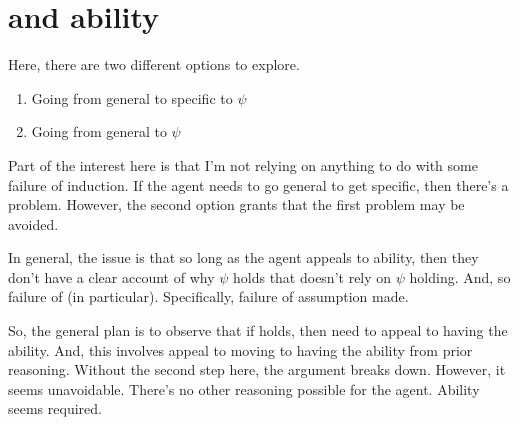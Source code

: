 




\newpage

\section{\nI{} and ability}
\label{sec:ni-ability}

\begin{note}[Notes]
  Here, there are two different options to explore.
  \begin{enumerate}
  \item Going from general to specific to \(\psi\)
  \item Going from general to \(\psi\)
  \end{enumerate}
  Part of the interest here is that I'm not relying on anything to do with some failure of induction.
  If the agent needs to go general to get specific, then there's a problem.
  However, the second option grants that the first problem may be avoided.

  In general, the issue is that so long as the agent appeals to ability, then they don't have a clear account of why \(\psi\) holds that doesn't rely on \(\psi\) holding.
  And, so failure of \ideaCSB{} (in particular).
  Specifically, failure of assumption made.
\end{note}

\begin{note}
  So, the general plan is to observe that if \ESU{} holds, then need to appeal to having the ability.
  And, this involves appeal to moving to having the ability from prior reasoning.
  Without the second step here, the argument breaks down.
  However, it seems unavoidable.
  There's no other reasoning possible for the agent.
  Ability seems required.
\end{note}

